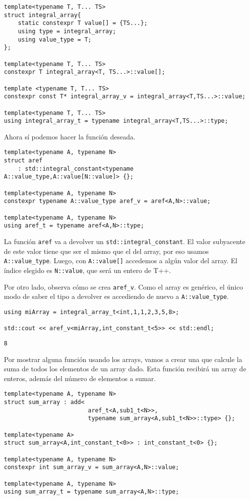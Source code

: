 \documentclass[11pt]{article}
\begin{document}
\begin{verbatim}
template<typename T, T... TS>
struct integral_array{
	static constexpr T value[] = {TS...};
	using type = integral_array;
	using value_type = T;
};

template<typename T, T... TS>
constexpr T integral_array<T, TS...>::value[];

template <typename T, T... TS>
constexpr const T* integral_array_v = integral_array<T,TS...>::value;

template<typename T, T... TS>
using integral_array_t = typename integral_array<T,TS...>::type;
\end{verbatim}

Ahora sí podemos hacer la función deseada.

\begin{verbatim}
template<typename A, typename N>
struct aref
	: std::integral_constant<typename A::value_type,A::value[N::value]> {};

template<typename A, typename N>
constexpr typename A::value_type aref_v = aref<A,N>::value;

template<typename A, typename N>
using aref_t = typename aref<A,N>::type;
\end{verbatim}

La función \texttt{aref} va a devolver un \texttt{std::integral\_constant}. El valor subyacente de este valor tiene que ser el mismo que el del array, por eso usamos \texttt{A::value\_type}. Luego, con \texttt{A::value[]} accedemos a algún valor del array. El índice elegido es \texttt{N::value}, que será un entero de T++.

Por otro lado, observa cómo se crea \texttt{aref\_v}. Como el array es genérico, el único modo de saber el tipo a devolver es accediendo de nuevo a \texttt{A::value\_type}.

\begin{verbatim}
using miArray = integral_array_t<int,1,1,2,3,5,8>;

std::cout << aref_v<miArray,int_constant_t<5>> << std::endl;
\end{verbatim}

\begin{verbatim}
8
\end{verbatim}


Por mostrar alguna función usando los arrays, vamos a crear una que calcule la suma de todos los elementos de un array dado. Esta función recibirá un array de enteros, además del número de elementos a sumar.

\begin{verbatim}
template<typename A, typename N>
struct sum_array : add<
						aref_t<A,sub1_t<N>>,
						typename sum_array<A,sub1_t<N>>::type> {};

template<typename A>
struct sum_array<A,int_constant_t<0>> : int_constant_t<0> {};

template<typename A, typename N>
constexpr int sum_array_v = sum_array<A,N>::value;

template<typename A, typename N>
using sum_array_t = typename sum_array<A,N>::type;
\end{verbatim}
\end{document}
